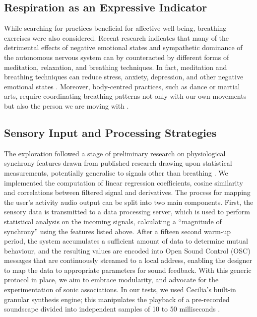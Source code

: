 \subsection*{Respiration as an Expressive Indicator}

While searching for practices beneficial for affective well-being, breathing exercises were also considered. Recent research indicates that many of the detrimental effects of negative emotional states and sympathetic dominance of the autonomous nervous system can by counteracted by different forms of meditation, relaxation, and breathing techniques. In fact, meditation and breathing techniques can reduce stress, anxiety, depression, and other negative emotional states \cite{brown_sudarshan_2005,descilo_effects_2010,jerath_self-regulation_2015}. Moreover, body-centred practices, such as dance or martial arts, require coordinating breathing patterns not only with our own movements but also the person we are moving with \cite{codrons_spontaneous_2014}.

\subsection*{Sensory Input and Processing Strategies}

The exploration followed a stage of preliminary research on physiological synchrony features drawn from published research drawing upon statistical measurements, potentially generalise to signals other than breathing \cite{zamm_endogenous_2016}. We implemented the computation of linear regression coefficients, cosine similarity and correlations between filtered signal and derivatives. The process for mapping the user’s activity audio output can be split into two main components. First, the sensory data is transmitted to a data processing server, which is used to perform statistical analysis on the incoming signals, calculating a “magnitude of synchrony” using the features listed above. After a fifteen second warm-up period, the system accumulates a sufficient amount of data to determine mutual behaviour, and the resulting values are encoded into Open Sound Control (OSC) messages that are continuously streamed to a local address, enabling the designer to map the data to appropriate parameters for sound feedback. With this generic protocol in place, we aim to embrace modularity, and advocate for the experimentation of sonic associations. In our tests, we used Cecilia’s \cite{Cecilia} built-in granular synthesis engine; this manipulates the playback of a pre-recorded soundscape divided into independent samples of 10 to 50 milliseconds \cite{roads_introduction_1988}.

